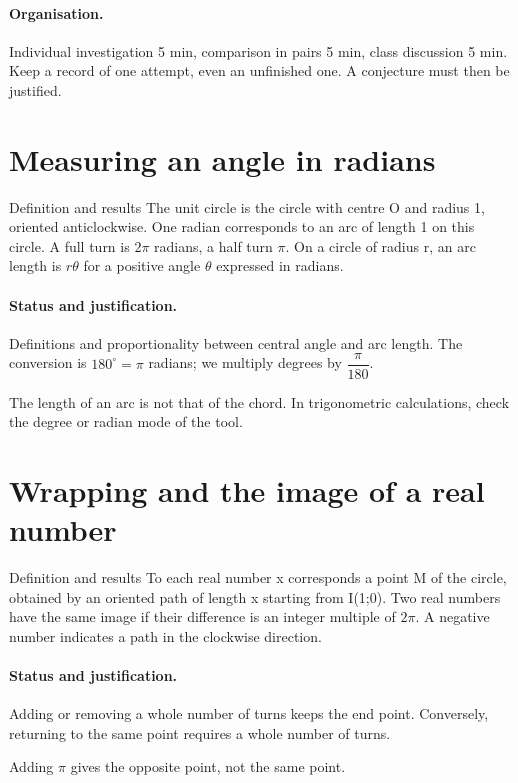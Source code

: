 \paragraph{Organisation.} Individual investigation 5 min, comparison in pairs 5 min, class discussion 5 min. Keep a record of one attempt, even an unfinished one. A conjecture must then be justified.
\section{Measuring an angle in radians}\label{C10-U1}
\begin{repere}{Definition and results}
The unit circle is the circle with centre O and radius 1, oriented anticlockwise. One radian corresponds to an arc of length 1 on this circle. A full turn is $2\pi$ radians, a half turn $\pi$. On a circle of radius r, an arc length is $r\theta$ for a positive angle $\theta$ expressed in radians.
\end{repere}
\paragraph{Status and justification.} Definitions and proportionality between central angle and arc length. The conversion is $180^\circ=\pi$ radians; we multiply degrees by $\dfrac{\pi}{180}$.
\label{C10-EX1}
\begin{erreur}The length of an arc is not that of the chord. In trigonometric calculations, check the degree or radian mode of the tool.\end{erreur}
\label{C10-AP1}
\section{Wrapping and the image of a real number}\label{C10-U2}
\begin{repere}{Definition and results}
To each real number x corresponds a point M of the circle, obtained by an oriented path of length x starting from I(1;0). Two real numbers have the same image if their difference is an integer multiple of $2\pi$. A negative number indicates a path in the clockwise direction.
\end{repere}
\paragraph{Status and justification.} Adding or removing a whole number of turns keeps the end point. Conversely, returning to the same point requires a whole number of turns.
\label{C10-EX2}
\begin{erreur}Adding $\pi$ gives the opposite point, not the same point.\end{erreur}
\label{C10-AP2}

